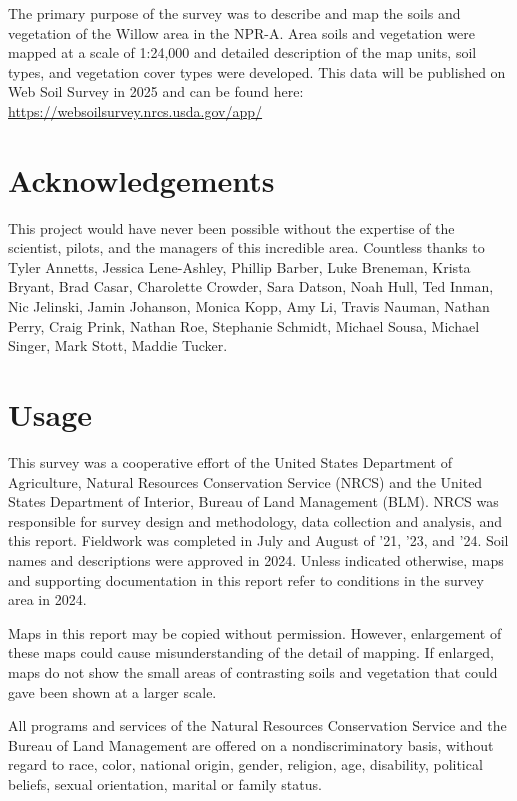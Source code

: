 \documentclass[
]{book}
\theoremstyle{definition}
\theoremstyle{definition}
\theoremstyle{definition}
\theoremstyle{definition}
\theoremstyle{remark}
\begin{document}
The primary purpose of the survey was to describe and map the soils and vegetation of the Willow area in the NPR-A. Area soils and vegetation were mapped at a scale of 1:24,000 and detailed description of the map units, soil types, and vegetation cover types were developed. This data will be published on Web Soil Survey in 2025 and can be found here: \url{https://websoilsurvey.nrcs.usda.gov/app/}

\hypertarget{acknowledgements}{%
\section{Acknowledgements}\label{acknowledgements}}

This project would have never been possible without the expertise of the scientist, pilots, and the managers of this incredible area. Countless thanks to Tyler Annetts, Jessica Lene-Ashley, Phillip Barber, Luke Breneman, Krista Bryant, Brad Casar, Charolette Crowder, Sara Datson, Noah Hull, Ted Inman, Nic Jelinski, Jamin Johanson, Monica Kopp, Amy Li, Travis Nauman, Nathan Perry, Craig Prink, Nathan Roe, Stephanie Schmidt, Michael Sousa, Michael Singer, Mark Stott, Maddie Tucker.

\hypertarget{usage}{%
\section{Usage}\label{usage}}

This survey was a cooperative effort of the United States Department of Agriculture, Natural Resources Conservation Service (NRCS) and the United States Department of Interior, Bureau of Land Management (BLM). NRCS was responsible for survey design and methodology, data collection and analysis, and this report. Fieldwork was completed in July and August of '21, '23, and '24. Soil names and descriptions were approved in 2024. Unless indicated otherwise, maps and supporting documentation in this report refer to conditions in the survey area in 2024.

Maps in this report may be copied without permission. However, enlargement of these maps could cause misunderstanding of the detail of mapping. If enlarged, maps do not show the small areas of contrasting soils and vegetation that could gave been shown at a larger scale.

All programs and services of the Natural Resources Conservation Service and the Bureau of Land Management are offered on a nondiscriminatory basis, without regard to race, color, national origin, gender, religion, age, disability, political beliefs, sexual orientation, marital or family status.
\end{document}
